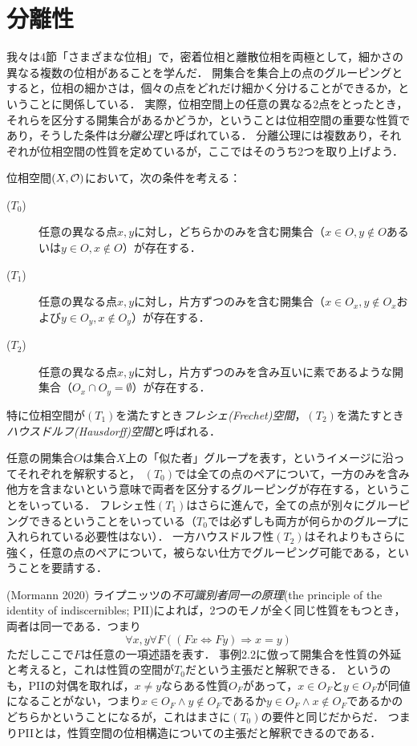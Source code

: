 \documentclass[11pt,a4paper]{jsarticle}
\begin{document}
\section{分離性}
我々は4節「さまざまな位相」で，密着位相と離散位相を両極として，細かさの異なる複数の位相があることを学んだ．
開集合を集合上の点のグルーピングとすると，位相の細かさは，個々の点をどれだけ細かく分けることができるか，ということに関係している．
実際，位相空間上の任意の異なる2点をとったとき，それらを区分する開集合があるかどうか，ということは位相空間の重要な性質であり，そうした条件は\emph{分離公理}と呼ばれている．
分離公理には複数あり，それぞれが位相空間の性質を定めているが，ここではそのうち2つを取り上げよう．

\begin{dfn}
位相空間$(X, \mathcal{O})$において，次の条件を考える：
\begin{description}
 \item[($T_0$)] 任意の異なる点$x, y$に対し，どちらかのみを含む開集合（$x \in O, y \not\in O$あるいは$y \in O, x \not\in O$）が存在する．
 \item[($T_1$)] 任意の異なる点$x, y$に対し，片方ずつのみを含む開集合（$x \in O_x, y \not\in O_x$および$y \in O_y, x \not\in O_y$）が存在する．
 \item[($T_2$)] 任意の異なる点$x, y$に対し，片方ずつのみを含み互いに素であるような開集合（$O_x \cap O_y = \emptyset$）が存在する．
\end{description} 
特に位相空間が$(T_1)$を満たすとき\emph{フレシェ(Frechet)空間}，$(T_2)$を満たすとき\emph{ハウスドルフ(Hausdorff)空間}と呼ばれる．
\end{dfn}

任意の開集合$O$は集合$X$上の「似た者」グループを表す，というイメージに沿ってそれぞれを解釈すると，
$(T_0)$では全ての点のペアについて，一方のみを含み他方を含まないという意味で両者を区分するグルーピングが存在する，ということをいっている．
フレシェ性$(T_1)$はさらに進んで，全ての点が別々にグルーピングできるということをいっている（$T_0$では必ずしも両方が何らかのグループに入れられている必要性はない）．
一方ハウスドルフ性$(T_2)$はそれよりもさらに強く，任意の点のペアについて，被らない仕方でグルーピング可能である，ということを要請する．

\begin{example}(Mormann 2020)
ライプニッツの\emph{不可識別者同一の原理}(the principle of the identity of indiscernibles; PII)によれば，2つのモノが全く同じ性質をもつとき，両者は同一である．つまり
\[
 \forall x, y \forall F ((Fx  \Leftrightarrow Fy) \Rightarrow x=y)
\]
ただしここで$F$は任意の一項述語を表す．
事例2.2に倣って開集合を性質の外延と考えると，これは性質の空間が$T_0$だという主張だと解釈できる．
というのも，PIIの対偶を取れば，$x\neq y$ならある性質$O_F$があって，$x \in O_F$と$y \in O_F$が同値になることがない，つまり$x \in O_F \wedge y \not\in O_F$であるか$y \in O_F \wedge x \not\in O_F$であるかのどちらかということになるが，これはまさに$(T_0)$の要件と同じだからだ．
つまりPIIとは，性質空間の位相構造についての主張だと解釈できるのである．
\end{example}
\end{document}
